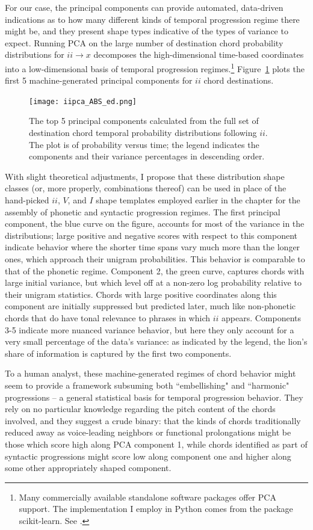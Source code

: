 For our case, the principal components can provide automated, data-driven indications as to how many different kinds of temporal progression regime there might be, and they present shape types indicative of the types of variance to expect.  Running PCA on the large number of destination chord probability distributions for $ii \rightarrow x$ decomposes the high-dimensional time-based coordinates into a low-dimensional basis of temporal progression regimes.\footnote{Many commercially available standalone software packages offer PCA support.  The implementation I employ in Python comes from the package scikit-learn.  See \cite{scikit-learn}.}  Figure~\ref{ii_pca} plots the first 5 machine-generated principal components for $ii$ chord destinations.

\begin{figure}
	\centering
	\caption{The top 5 principal components calculated from the full set of destination chord temporal probability distributions following $ii$.  The plot is of probability versus time; the legend indicates the components and their variance percentages in descending order.}
	\texttt{[image: iipca\_ABS\_ed.png]}
	\label{ii_pca}
\end{figure}

With slight theoretical adjustments, I propose that these distribution shape classes (or, more properly, combinations thereof) can be used in place of the hand-picked $ii$, $V$, and $I$ shape templates employed earlier in the chapter for the assembly of phonetic and syntactic progression regimes.  The first principal component, the blue curve on the figure, accounts for most of the variance in the distributions; large positive and negative scores with respect to this component indicate behavior where the shorter time spans vary much more than the longer ones, which approach their unigram probabilities.  This behavior is comparable to that of the phonetic regime.  Component 2, the green curve, captures chords with large initial variance, but which level off at a non-zero log probability relative to their unigram statistics.  Chords with large positive coordinates along this component are initially suppressed but predicted later, much like non-phonetic chords that do have tonal relevance to phrases in which $ii$ appears.  Components 3-5 indicate more nuanced variance behavior, but here they only account for a very small percentage of the data's variance: as indicated by the legend, the lion's share of information is captured by the first two components.

To a human analyst, these machine-generated regimes of chord behavior might seem to provide a framework subsuming both ``embellishing" and ``harmonic" progressions -- a general statistical basis for temporal progression behavior.  They rely on no particular knowledge regarding the pitch content of the chords involved, and they suggest a crude binary: that the kinds of chords traditionally reduced away as voice-leading neighbors or functional prolongations might be those which score high along PCA component 1, while chords identified as part of syntactic progressions might score low along component one and higher along some other appropriately shaped component.

